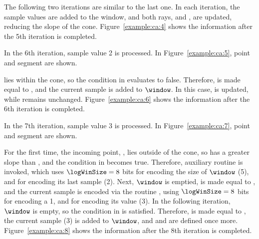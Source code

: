 \vspace{+5pt}


The following two iterations are similar to the last one. In each iteration, the sample values are added to the window, and both rays, \smin and \smax, are updated, reducing the slope of the cone. Figure~\ref{example:ca:4} shows the information after the 5th iteration is completed.


\vspace{+5pt}


\clearpage


In the 6th iteration, sample value 2 is processed. In Figure~\ref{example:ca:5}, point  and segment  are shown.




 lies within the cone, so the condition in  evaluates to false. Therefore, \snapshot is made equal to , and the current sample is added to $\window$. In this case, \smin is updated, while \smax remains unchanged. Figure~\ref{example:ca:6} shows the information after the 6th iteration is completed.


\vspace{+5pt}


\clearpage

In the 7th iteration, sample value 3 is processed. In Figure~\ref{example:ca:7}, point  and segment  are shown.




For the first time, the incoming point, , lies outside of the cone, so  has a greater slope than \smax, and the condition in  becomes true. Therefore, auxiliary routine \CAWinEnd is invoked, which uses $\logWinSize = 8$ bits for encoding the size of $\window$ (5), and \tobitexp for encoding its last sample (2). Next, $\window$ is emptied, \archived is made equal to , and the current sample is encoded via the routine \CAWinStart, using $\logWinSize =8$ bits for encoding a 1, and \tobitexp for encoding its value (3). In the following iteration, $\window$ is empty, so the condition in  is satisfied. Therefore, \snapshot is made equal to , the current sample (3) is added to $\window$, and \smin and \smax are defined once more. Figure~\ref{example:ca:8} shows the information after the 8th iteration is completed.


